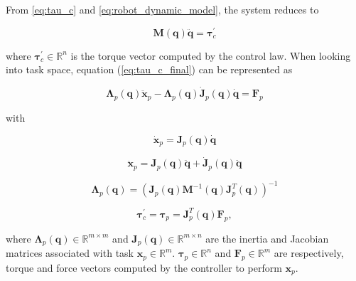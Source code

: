 From \ref{eq:tau_c} and \ref{eq:robot_dynamic_model}, the system reduces to

\begin{equation}
    \label{eq:tau_c_final}
    \boldsymbol{M}(\boldsymbol{q})\boldsymbol{\ddot{q}} = \boldsymbol{\tau}^\prime_c
\end{equation}

where $\boldsymbol{\tau}^\prime_c \in \mathbb{R}^n$ is the torque vector computed by the control law. When looking into task space, equation (\ref{eq:tau_c_final}) can be represented as \cite{Santos2018_computed_torque_control_robotic_assisted_tele_ecography}

\begin{equation}
    \label{eq:fp_lambdas}
    \boldsymbol{\Lambda}_p(\boldsymbol{q}) \boldsymbol{\ddot{x}}_p - \boldsymbol{\Lambda}_p(\boldsymbol{q}) \boldsymbol{\dot{J}}_p(\boldsymbol{q})\boldsymbol{\dot{q}} = \boldsymbol{F}_p    
\end{equation}

with

\begin{equation}
    \boldsymbol{\dot{x}}_p = \boldsymbol{J}_p(\boldsymbol{q})\boldsymbol{\dot{q}}
\end{equation}

\begin{equation}
    \boldsymbol{\ddot{x}}_p = \boldsymbol{J}_p(\boldsymbol{q})\boldsymbol{\ddot{q}} + \boldsymbol{\dot{J}}_p(\boldsymbol{q})\boldsymbol{\ddot{q}}
\end{equation}

\begin{equation}
    \boldsymbol{\Lambda}_p(\boldsymbol{q}) = (\boldsymbol{J}_p(\boldsymbol{q})\boldsymbol{M}^{-1}(\boldsymbol{q})\boldsymbol{J}^T_p(\boldsymbol{q}))^{-1}
\end{equation}

\begin{equation}
    \label{eq:tc_tp}
    \boldsymbol{\tau}^\prime_c = \boldsymbol{\tau}_p = \boldsymbol{J}^T_p(\boldsymbol{q})\boldsymbol{F}_p,
\end{equation}

where $\boldsymbol{\Lambda}_p(\boldsymbol{q}) \in \mathbb{R}^{m\times m}$ and $\boldsymbol{J}_p(\boldsymbol{q}) \in \mathbb{R}^{m\times n}$ are the inertia and Jacobian matrices associated with task $\boldsymbol{x}_p \in \mathbb{R}^m$. $\boldsymbol{\tau}_p \in \mathbb{R}^n$ and $\boldsymbol{F}_p \in \mathbb{R}^m$ are respectively, torque and force vectors computed by the controller to perform $\boldsymbol{x}_p$.

